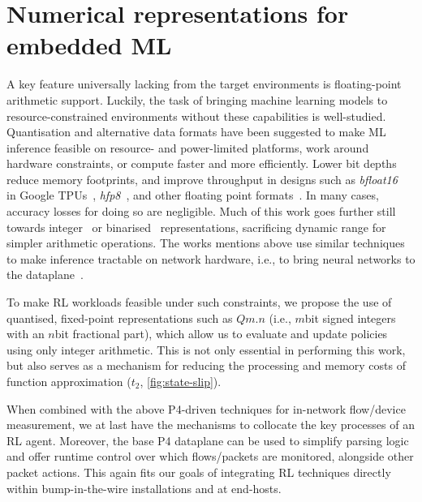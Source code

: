 \section{Numerical representations for embedded ML}\label{sec:numerical-representations-for-embedded-ml}
A key feature universally lacking from the target environments is floating-point arithmetic support.
Luckily, the task of bringing machine learning models to resource-constrained environments without these capabilities is well-studied.
Quantisation and alternative data formats have been suggested to make ML inference feasible on resource- and power-limited platforms, work around hardware constraints, or compute faster and more efficiently.
Lower bit depths reduce memory footprints, and improve throughput in designs such as \emph{bfloat16}~\parencite{bfloat16-blog} in Google TPUs~\parencite{DBLP:journals/sigops/XieDMKVZT18}, \emph{hfp8}~\parencite{DBLP:conf/nips/SunCCWVSCZG19}, and other floating point formats~\parencite{DBLP:journals/corr/abs-2007-01530}.
In many cases, accuracy losses for doing so are negligible.
Much of this work goes further still towards integer~\parencite{tensorrt-8bit} or binarised~\parencite{DBLP:journals/corr/MiyashitaLM16,DBLP:conf/eccv/RastegariORF16,DBLP:journals/corr/KimS16,DBLP:conf/nips/HubaraCSEB16} representations, sacrificing dynamic range for simpler arithmetic operations.
The works mentions above use similar techniques to make inference tractable on network hardware, i.e., to bring neural networks to the dataplane~\parencite{DBLP:journals/corr/abs-2009-02353,DBLP:conf/sigcomm/SanvitoSB18,DBLP:journals/corr/abs-1801-05731}.

To make RL workloads feasible under such constraints, we propose the use of quantised, fixed-point representations such as $Qm.n$ (i.e., $m$\si{bit} signed integers with an $n$\si{bit} fractional part), which allow us to evaluate and update policies using only integer arithmetic.
This is not only essential in performing this work, but also serves as a mechanism for reducing the processing and memory costs of function approximation ($t_2$, \cref{fig:state-slip}).

When combined with the above P4-driven techniques for in-network flow/device measurement, we at last have the mechanisms to collocate the key processes of an RL agent.
Moreover, the base P4 dataplane can be used to simplify parsing logic and offer runtime control over which flows/packets are monitored, alongside other packet actions.
This again fits our goals of integrating RL techniques directly within bump-in-the-wire installations and at end-hosts.

